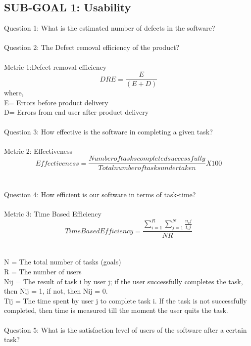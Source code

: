 \documentclass[a4paper, 11pt]{article}
\begin{document}
\subsection{SUB-GOAL 1: Usability}
Question 1: What is the estimated number of defects in the software?\\ \\
Question 2: The Defect removal efficiency of the product?\\ \\ 
Metric 1:Defect removal efficiency\cite{10}
\begin{equation*}
 DRE = \frac{E}{(E+D)}     
\end{equation*}
 where,  \\
E= Errors before product delivery \\
       	D= Errors from end user after product delivery\\ \\
Question 3: How effective is the software in completing a given task?\\ \\
Metric 2: Effectiveness\cite{10}\cite{11} 
\begin{equation*}
    Effectiveness = \frac{Number of tasks completed successfully}{Total  number of tasks undertaken}X100%
\end{equation*}\\ \\
Question 4: How efficient is our software in terms of task-time?\\ \\
Metric 3: Time Based Efficiency\cite{12}
 	\begin{equation*}
    Time Based Efficiency = \frac{\sum_{i=1}^{R} \sum_{j=1}^{N} \frac{n_ij}{t_ij}}{NR}
\end{equation*}\\ \\ 
N = The total number of tasks (goals)\\
R = The number of users\\
Nij = The result of task i by user j; if the user successfully completes the task, then Nij = 1, if not, then Nij = 0.\\
Tij = The time spent by user j to complete task i. If the task is not successfully completed, then time is measured till the moment the user quits the task.\\ \\
Question 5: What is the satisfaction level of users of the software after a certain task?\\  \\
\end{document}

